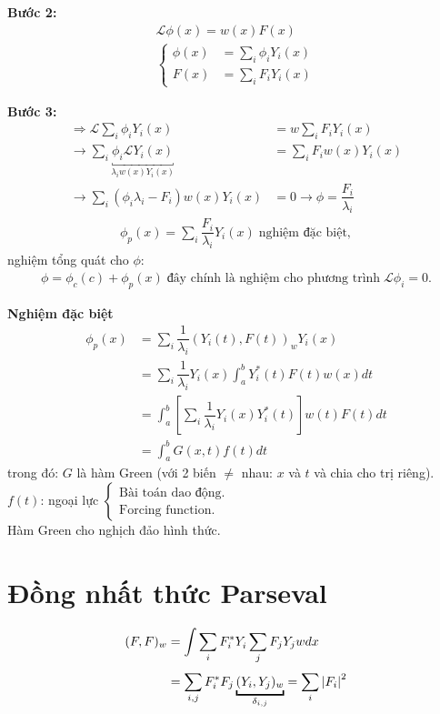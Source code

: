 \documentclass{report}
\newcommand{\dps}{\displaystyle}
\newcommand{\f}[2]{\dfrac{#1}{#2}}
\begin{document}
\textbf{Bước 2:}
\begin{align*}
	\mathcal{L} \phi(x) = w(x) F(x) \\
	\begin{cases}
		\phi(x) & = \dps\sum_{i}\phi_i Y_i(x) \\
		F(x)    & = \dps\sum_{i}F_i Y_i(x)
	\end{cases}
\end{align*}

\textbf{Bước 3:}
\begin{align*}
	\Rightarrow \mathcal{L}\sum_i \phi_i Y_i(x)                                          & = w\sum_{i}F_i Y_i(x)                     \\
	\rightarrow \sum_{i} \underbracket{\phi_i \mathcal{L} Y_i(x)}_{\lambda_i w(x)Y_i(x)} & = \sum_{i} F_i w(x) Y_i(x)                \\
	\rightarrow \sum_{i}\left( \phi_i \lambda_i - F_i \right)w(x) Y_i(x)                 & = 0 \rightarrow \phi = \f{F_i}{\lambda_i}
\end{align*}
\begin{align*}
	\phi_p (x) = \sum_{i} \f{F_i}{\lambda_i} Y_i(x) \; \text{nghiệm đặc biệt},
\end{align*}
nghiệm tổng quát cho $\phi$:
\begin{align*}
	\phi = \phi_c(c) + \phi_p(x) \; \text{đây chính là nghiệm cho phương trình} \; \mathcal{L}\phi_i = 0.
\end{align*}

\textbf{Nghiệm đặc biệt}
\begin{align*}
	\phi_p(x) & = \sum_{i} \f{1}{\lambda_i}\left( Y_i(t), F(t) \right)_w Y_i(x)                               \\
	          & = \sum_{i} \f{1}{\lambda_i} Y_i(x) \int_{a}^{b} Y^{\ast}_{i}(t) F(t)w(x)dt                    \\
	          & = \int_{a}^{b} \left[ \sum_{i} \f{1}{\lambda_i} Y^{}_{i}(x) Y^{\ast}_{i}(t) \right]w(t)F(t)dt \\
	          & = \int_{a}^{b} G(x,t)f(t)dt
\end{align*}
trong đó: $G$ là hàm Green (với 2 biến $\neq$ nhau: $x$ và $t$ và chia cho trị riêng).\\
$f(t)$: ngoại lực
$\begin{cases}
		\text{Bài toán dao động.} \\
		\text{Forcing function.}
	\end{cases}$\\
Hàm Green cho nghịch đảo hình thức.
\section{Đồng nhất thức Parseval}
\begin{align*}
	(F,F)_w & = \int \sum_{i} F^{\ast}_i Y^{}_i \sum_{j} F_j Y_j w dx                                       \\
	        & =\sum_{i,j} F^{\ast}_i F_j \underbracket{(Y_i,Y_j)_w}_{\delta_{i,j}} = \sum_{i}^{}\abs{F_i}^2
\end{align*}
\end{document}

